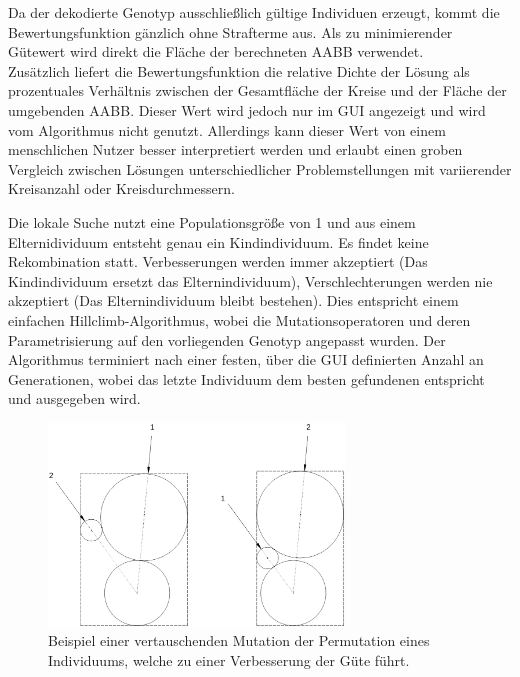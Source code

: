 \documentclass[twoside,bibtotoc]{report}
\begin{document}
\nsecend%



Da der dekodierte Genotyp ausschließlich gültige Individuen erzeugt, kommt die Bewertungsfunktion gänzlich ohne Strafterme aus.
Als zu minimierender Gütewert wird direkt die Fläche der berechneten \gls{AABB} verwendet.\\

Zusätzlich liefert die Bewertungsfunktion die relative Dichte der Lösung als prozentuales Verhältnis zwischen der Gesamtfläche der Kreise und der Fläche der umgebenden \gls{AABB}. Dieser Wert wird jedoch nur im \gls{GUI} angezeigt und wird vom Algorithmus nicht genutzt. Allerdings kann dieser Wert von einem menschlichen Nutzer besser interpretiert werden und erlaubt einen groben Vergleich zwischen Lösungen unterschiedlicher Problemstellungen mit variierender Kreisanzahl oder Kreisdurchmessern.

\nsecend%




Die lokale Suche nutzt eine Populationsgröße von 1 und aus einem Elternidividuum entsteht genau ein Kindindividuum.
Es findet keine Rekombination statt.
Verbesserungen werden immer akzeptiert (Das Kindindividuum ersetzt das Elternindividuum), Verschlechterungen werden nie akzeptiert (Das Elternindividuum bleibt bestehen).
Dies entspricht einem einfachen Hillclimb-Algorithmus, wobei die Mutationsoperatoren und deren Parametrisierung auf den vorliegenden Genotyp angepasst wurden.
Der Algorithmus terminiert nach einer festen, über die \gls{GUI} definierten Anzahl an Generationen, wobei das letzte Individuum dem besten gefundenen entspricht und ausgegeben wird.

\nsecend%



\begin{figure}[h]
 \centering
 \includegraphics [width=0.7\textwidth]{Bilder/4.png}
 \caption{
 	Beispiel einer vertauschenden Mutation der Permutation eines Individuums,
 	welche zu einer Verbesserung der Güte führt.
 	}
 \label{fig:mutate_permutation_switch}
\end{figure}
\end{document}
